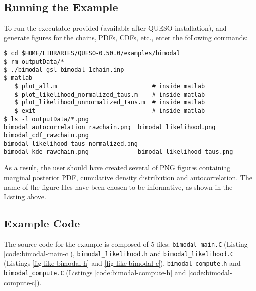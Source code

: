 \subsection{Running the Example}\label{sec:bimodal-run}

To run the executable provided (available after QUESO installation), and generate figures for the chains, PDFs, CDFs, etc., enter the following commands:
\begin{lstlisting}[label={},caption={}]
$ cd $HOME/LIBRARIES/QUESO-0.50.0/examples/bimodal
$ rm outputData/*
$ ./bimodal_gsl bimodal_1chain.inp    
$ matlab
   $ plot_all.m	                          # inside matlab
   $ plot_likelihood_normalized_taus.m    # inside matlab
   $ plot_likelihood_unnormalized_taus.m  # inside matlab
   $ exit                                 # inside matlab
$ ls -l outputData/*.png
bimodal_autocorrelation_rawchain.png  bimodal_likelihood.png
bimodal_cdf_rawchain.png	          bimodal_likelihood_taus_normalized.png
bimodal_kde_rawchain.png	          bimodal_likelihood_taus.png
\end{lstlisting}


As a result, the user should have created several of PNG figures containing marginal posterior PDF, cumulative density distribution and autocorrelation. The name of the figure files have been chosen to be informative, as shown in the Listing above.




\subsection{Example Code}\label{sec:bimodal-code}

The source code for the example is composed of 5 files:
\texttt{bimodal\_main.C} (Listing \ref{code:bimodal-main-c}), \linebreak
\texttt{bimodal\_likelihood.h} and \texttt{bimodal\_likelihood.C} (Listings \ref{fig-like-bimodal-h} and \ref{fig-like-bimodal-c}),
\texttt{bimodal\_compute.h} and \texttt{bimodal\_compute.C} (Listings \ref{code:bimodal-compute-h} and \ref{code:bimodal-compute-c}).






